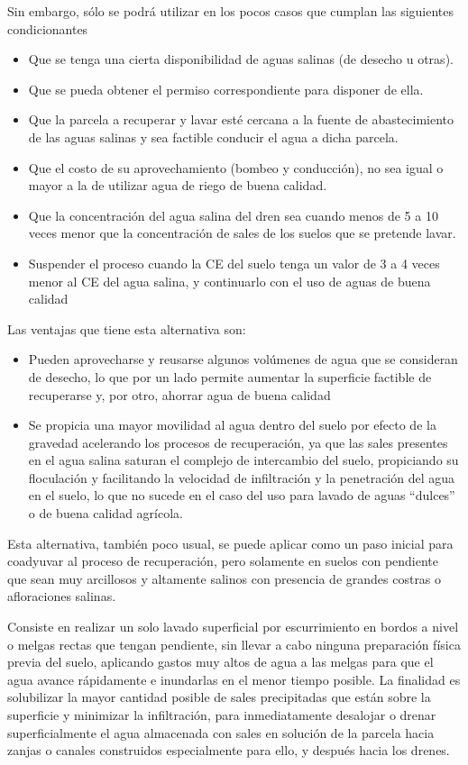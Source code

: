 Sin embargo, sólo se podrá utilizar en los pocos casos que cumplan las siguientes condicionantes
\begin{itemize}
    \item Que se tenga una cierta disponibilidad de aguas salinas (de desecho u otras).
    \item Que se pueda obtener el permiso correspondiente para disponer de ella.
    \item Que la parcela a recuperar y lavar esté cercana a la fuente de abastecimiento de las aguas salinas y sea factible conducir el agua a dicha parcela.
    \item Que el costo de su aprovechamiento (bombeo y conducción), no sea igual o mayor a la de utilizar agua de riego de buena calidad.
    \item Que la concentración del agua salina del dren sea cuando menos de 5 a 10 veces menor que la concentración de sales de los suelos que se pretende lavar.
    \item Suspender el proceso cuando la CE del suelo tenga un valor de 3 a 4 veces menor al CE del agua salina, y continuarlo con el uso de aguas de buena calidad
\end{itemize}
Las ventajas que tiene esta alternativa son:
\begin{itemize}
    \item Pueden aprovecharse y reusarse algunos volúmenes de agua que se consideran de desecho, lo que por un lado permite aumentar la superficie factible de recuperarse y, por otro, ahorrar agua de buena calidad
    \item Se propicia una mayor movilidad al agua dentro del suelo por efecto de la gravedad acelerando los procesos de recuperación, ya que las sales presentes en el agua salina saturan el complejo de intercambio del suelo, propiciando su floculación y facilitando la velocidad de infiltración y la penetración del agua en el suelo, lo que no sucede en el caso del uso para lavado de aguas “dulces” o de buena calidad agrícola.
\end{itemize}
Esta alternativa, también poco usual, se puede aplicar como un paso inicial para coadyuvar al proceso de recuperación, pero solamente en suelos con pendiente que sean muy arcillosos y altamente salinos con presencia de grandes costras o afloraciones salinas.

Consiste en realizar un solo lavado superficial por escurrimiento en bordos a nivel o melgas rectas que tengan pendiente, sin llevar a cabo ninguna preparación física previa del suelo, aplicando gastos muy altos de agua a las melgas para que el agua avance rápidamente e inundarlas en el menor tiempo posible. La finalidad es solubilizar la mayor cantidad posible de sales precipitadas que están sobre la superficie y minimizar la infiltración, para inmediatamente desalojar o drenar superficialmente el agua almacenada con sales en solución de la parcela hacia zanjas o canales construidos especialmente para ello, y después hacia los drenes.

